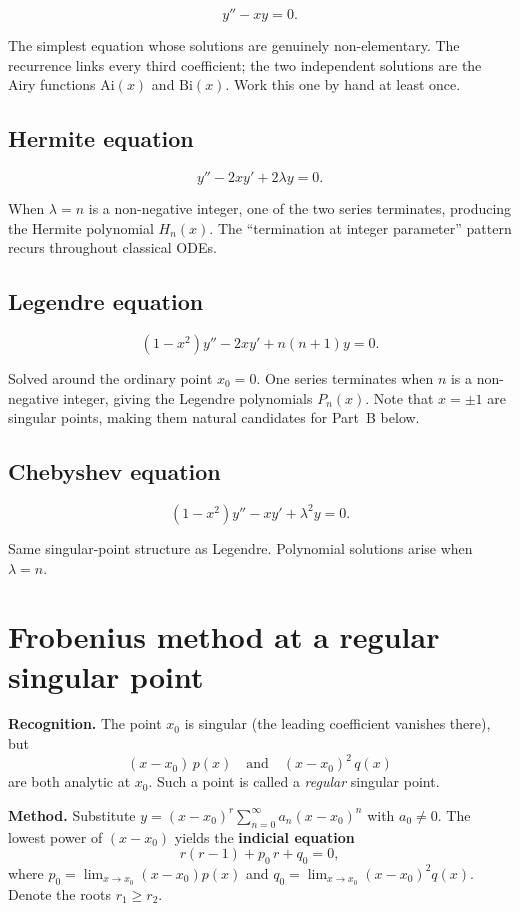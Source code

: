 \documentclass{essay}
\begin{document}
\[ y'' - xy = 0. \]

The simplest equation whose solutions are genuinely non-elementary.  The recurrence links every third coefficient; the two independent solutions are the Airy functions \(\mathrm{Ai}(x)\) and \(\mathrm{Bi}(x)\).  Work this one by hand at least once.

\subsection*{Hermite equation}

\[ y'' - 2xy' + 2\lambda y = 0. \]

When \(\lambda = n\) is a non-negative integer, one of the two series terminates, producing the Hermite polynomial \(H_{n}(x)\).  The ``termination at integer parameter'' pattern recurs throughout classical ODEs.

\subsection*{Legendre equation}

\[ (1-x^{2})y'' - 2xy' + n(n+1)y = 0. \]

Solved around the ordinary point \(x_{0} = 0\).  One series terminates when \(n\) is a non-negative integer, giving the Legendre polynomials \(P_{n}(x)\).  Note that \(x = \pm 1\) are singular points, making them natural candidates for Part~B below.

\subsection*{Chebyshev equation}

\[ (1-x^{2})y'' - xy' + \lambda^{2} y = 0. \]

Same singular-point structure as Legendre.  Polynomial solutions arise when \(\lambda = n\).

\section{Frobenius method at a regular singular point}

\textbf{Recognition.}  The point \(x_{0}\) is singular (the leading coefficient vanishes there), but
\[ (x - x_{0})\,p(x) \quad\text{and}\quad (x-x_{0})^{2}\,q(x) \]
are both analytic at \(x_{0}\).  Such a point is called a \emph{regular} singular point.

\textbf{Method.}  Substitute \(y = (x-x_{0})^{r} \sum_{n=0}^{\infty} a_{n} (x-x_{0})^{n}\) with \(a_{0} \neq 0\).  The lowest power of \((x-x_{0})\) yields the \textbf{indicial equation}
\[ r(r-1) + p_{0}\,r + q_{0} = 0, \]
where \(p_{0} = \lim_{x\to x_{0}}(x-x_{0})p(x)\) and \(q_{0} = \lim_{x\to x_{0}}(x-x_{0})^{2} q(x)\).  Denote the roots \(r_{1} \geq r_{2}\).
\end{document}

